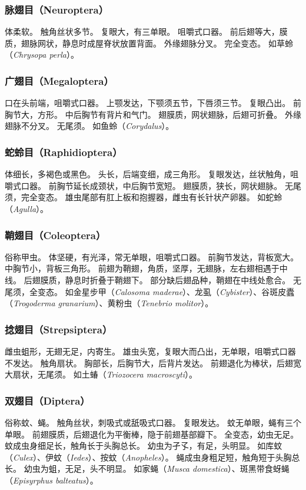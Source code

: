 \documentclass[11pt]{article}
\begin{document}
\subsubsection{脉翅目（Neuroptera）}
体柔软。
触角丝状多节。
复眼大，有三单眼。
咀嚼式口器。
前后翅等大，膜质，翅脉网状，静息时成屋脊状放置背面。
外缘翅脉分叉。
完全变态。
如草蛉（\textit{Chrysopa perla}）。

\subsubsection{广翅目（Megaloptera）}
口在头前端，咀嚼式口器。
上颚发达，下颚须五节，下唇须三节。
复眼凸出。
前胸节大，方形。
中后胸节有背片和气门。
翅膜质，网状翅脉，后翅可折叠。
外缘翅脉不分叉。
无尾须。
如鱼蛉（\textit{Corydalus}）。

\subsubsection{蛇蛉目（Raphidioptera）}
体细长，多褐色或黑色。
头长，后端变细，成三角形。
复眼发达，丝状触角，咀嚼式口器。
前胸节延长成颈状，中后胸节宽短。
翅膜质，狭长，网状翅脉。
无尾须，完全变态。
雄虫尾部有肛上板和抱握器，雌虫有长针状产卵器。
如蛇蛉（\textit{Agulla}）。

\subsubsection{鞘翅目（Coleoptera）}
俗称甲虫。
体坚硬，有光泽，常无单眼，咀嚼式口器。
前胸节发达，背板宽大。
中胸节小，背板三角形。
前翅为鞘翅，角质，坚厚，无翅脉，左右翅相遇于中线。
后翅膜质，静息时折叠于鞘翅下。
部分缺后翅品种，鞘翅在中线处愈合。
无尾须，全变态。
如金星步甲（\textit{Calosoma maderae}）、龙虱（\textit{Cybister}）、谷斑皮蠹（\textit{Trogoderma granarium}）、黄粉虫（\textit{Tenebrio molitor}）。

\subsubsection{捻翅目（Strepsiptera）}
雌虫蛆形，无翅无足，内寄生。
雄虫头宽，复眼大而凸出，无单眼，咀嚼式口器不发达。
触角扇状。
胸部长，后胸节大，后背片发达。
前翅退化为棒状，后翅宽大扇状，无尾须。
如土蝽（\textit{Triozocera macroscyti}）。


\subsubsection{双翅目（Diptera）}
俗称蚊、蝇。
触角丝状，刺吸式或舐吸式口器。
复眼发达。
蚊无单眼，蝇有三个单眼。
前翅膜质，后翅退化为平衡棒，隐于前翅基部瓣下。
全变态，幼虫无足。
蚊成虫身细足长，触角长于头胸总长。
幼虫为孑孓，有足，头明显。
如库蚊（\textit{Culex}）、伊蚊（\textit{Iedes}）、按蚊（\textit{Anopheles}）。
蝇成虫身粗足短，触角短于头胸总长。
幼虫为蛆，无足，头不明显。
如家蝇（\textit{Musca domestica}）、斑黑带食蚜蝇（\textit{Episyrphus balteatus}）。
\end{document}
